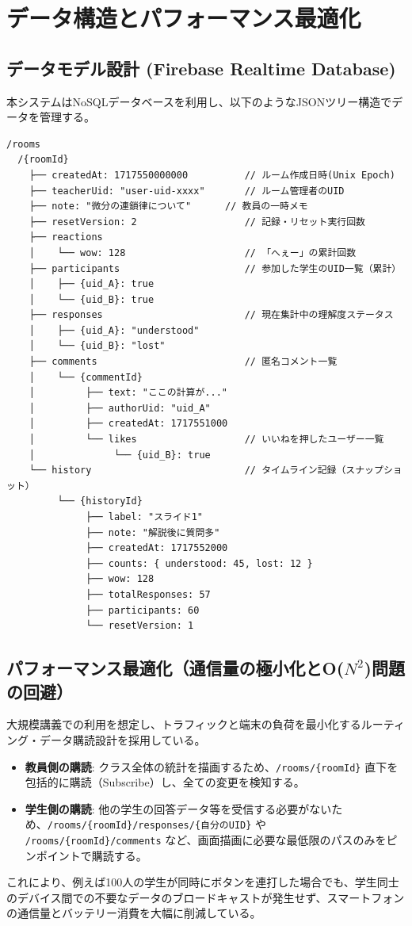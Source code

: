 \documentclass[11pt,a4paper]{jsarticle}
\begin{document}
\section{データ構造とパフォーマンス最適化}

\subsection{データモデル設計 (Firebase Realtime Database)}
本システムはNoSQLデータベースを利用し、以下のようなJSONツリー構造でデータを管理する。

\begin{lstlisting}
/rooms
  /{roomId}
    ├── createdAt: 1717550000000          // ルーム作成日時(Unix Epoch)
    ├── teacherUid: "user-uid-xxxx"       // ルーム管理者のUID
    ├── note: "微分の連鎖律について"      // 教員の一時メモ
    ├── resetVersion: 2                   // 記録・リセット実行回数
    ├── reactions
    │    └── wow: 128                     // 「へぇー」の累計回数
    ├── participants                      // 参加した学生のUID一覧（累計）
    │    ├── {uid_A}: true                
    │    └── {uid_B}: true
    ├── responses                         // 現在集計中の理解度ステータス
    │    ├── {uid_A}: "understood"        
    │    └── {uid_B}: "lost"
    ├── comments                          // 匿名コメント一覧
    │    └── {commentId}
    │         ├── text: "ここの計算が..."
    │         ├── authorUid: "uid_A"
    │         ├── createdAt: 1717551000
    │         └── likes                   // いいねを押したユーザー一覧
    │              └── {uid_B}: true      
    └── history                           // タイムライン記録（スナップショット）
         └── {historyId}
              ├── label: "スライド1"
              ├── note: "解説後に質問多"
              ├── createdAt: 1717552000
              ├── counts: { understood: 45, lost: 12 }
              ├── wow: 128
              ├── totalResponses: 57
              ├── participants: 60
              └── resetVersion: 1
\end{lstlisting}

\subsection{パフォーマンス最適化（通信量の極小化とO($N^2$)問題の回避）}
大規模講義での利用を想定し、トラフィックと端末の負荷を最小化するルーティング・データ購読設計を採用している。

\begin{itemize}
    \item \textbf{教員側の購読}: クラス全体の統計を描画するため、\texttt{/rooms/\{roomId\}} 直下を包括的に購読（Subscribe）し、全ての変更を検知する。
    \item \textbf{学生側の購読}: 他の学生の回答データ等を受信する必要がないため、\texttt{/rooms/\{roomId\}/responses/\{自分のUID\}} や \texttt{/rooms/\{roomId\}/comments} など、画面描画に必要な最低限のパスのみをピンポイントで購読する。
\end{itemize}
これにより、例えば100人の学生が同時にボタンを連打した場合でも、学生同士のデバイス間での不要なデータのブロードキャストが発生せず、スマートフォンの通信量とバッテリー消費を大幅に削減している。
\end{document}
